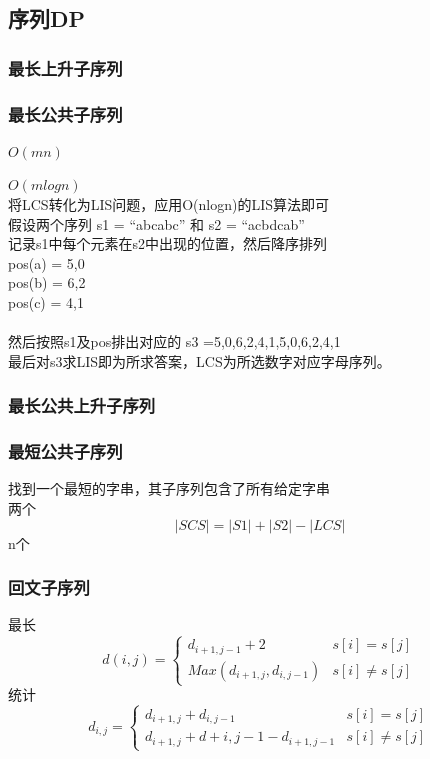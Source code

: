 \documentclass{article}
\begin{document}
\subsection{序列DP}
\subsubsection{最长上升子序列}

\subsubsection{最长公共子序列}
$O(mn)$

$O(mlogn)$	\\
将LCS转化为LIS问题，应用O(nlogn)的LIS算法即可	\\
假设两个序列 s1 = “abcabc” 和 s2 = “acbdcab”\\
记录s1中每个元素在s2中出现的位置，然后降序排列	\\
pos(a) = {5,0}								\\	
pos(b) = {6,2}								\\
pos(c) = {4,1}								\\
\\
然后按照s1及pos排出对应的 s3 ={5,0,6,2,4,1,5,0,6,2,4,1}	\\
最后对s3求LIS即为所求答案，LCS为所选数字对应字母序列。			\\

\subsubsection{最长公共上升子序列}

\subsubsection{最短公共子序列}
找到一个最短的字串，其子序列包含了所有给定字串	\\
两个
$$ |SCS|=|S1|+|S2|−|LCS| $$
n个

\subsubsection{回文子序列}
最长
$$
d(i,j)= \begin{cases} 
d_{i+1,j-1} + 2  &s[i]=s[j] \\ 
Max(d_{i+1,j},d_{i,j-1}) &s[i] \ne s[j] 
\end{cases}
$$
统计
$$
d_{i,j}= 
\begin{cases}
d_{i+1,j} + d_{i,j-1}   &s[i]=s[j] \\
d_{i+1,j} + d+{i,j-1} - d_{i+1,j-1}  &s[i] \ne s[j] 
\end{cases}
$$
\end{document}
